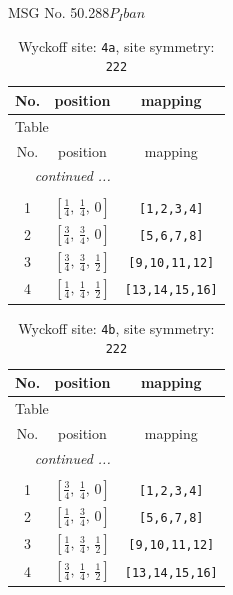 \documentclass[fleqn,8pt]{jsarticle}
\begin{document}
\setcounter{MaxMatrixCols}{32}

\renewcommand{\tablename}{Table~}
\renewcommand{\figurename}{Figure~}
\begin{center}
\LARGE
MSG No. 50.288\quad$P_{I}ban$
\end{center}
\renewcommand{\arraystretch}{1.2}
\begin{longtable}{ccc}
\caption{Wyckoff site: {\tt 4a}, site symmetry: {\tt 222}}
 \\
 \hline \hline
No. & position & mapping \\ \hline \endfirsthead

\multicolumn{2}{l}{\tablename\ \thetable{}} \\
 \hline \hline
No. & position & mapping \\ \hline \endhead

 \hline \hline
\multicolumn{2}{r}{\footnotesize\it continued ...} \\ \endfoot

 \hline \hline
\multicolumn{2}{r}{} \\ \endlastfoot

1 & $\left[ \frac{1}{4},\, \frac{1}{4},\, 0 \right]$ & {\tt [1,2,3,4]} \\ \hline
2 & $\left[ \frac{3}{4},\, \frac{3}{4},\, 0 \right]$ & {\tt [5,6,7,8]} \\ \hline
3 & $\left[ \frac{3}{4},\, \frac{3}{4},\, \frac{1}{2} \right]$ & {\tt [9,10,11,12]} \\ \hline
4 & $\left[ \frac{1}{4},\, \frac{1}{4},\, \frac{1}{2} \right]$ & {\tt [13,14,15,16]} \\
\end{longtable}
\renewcommand{\arraystretch}{1.2}
\begin{longtable}{ccc}
\caption{Wyckoff site: {\tt 4b}, site symmetry: {\tt 222}}
 \\
 \hline \hline
No. & position & mapping \\ \hline \endfirsthead

\multicolumn{2}{l}{\tablename\ \thetable{}} \\
 \hline \hline
No. & position & mapping \\ \hline \endhead

 \hline \hline
\multicolumn{2}{r}{\footnotesize\it continued ...} \\ \endfoot

 \hline \hline
\multicolumn{2}{r}{} \\ \endlastfoot

1 & $\left[ \frac{3}{4},\, \frac{1}{4},\, 0 \right]$ & {\tt [1,2,3,4]} \\ \hline
2 & $\left[ \frac{1}{4},\, \frac{3}{4},\, 0 \right]$ & {\tt [5,6,7,8]} \\ \hline
3 & $\left[ \frac{1}{4},\, \frac{3}{4},\, \frac{1}{2} \right]$ & {\tt [9,10,11,12]} \\ \hline
4 & $\left[ \frac{3}{4},\, \frac{1}{4},\, \frac{1}{2} \right]$ & {\tt [13,14,15,16]} \\
\end{longtable}
\end{document}
